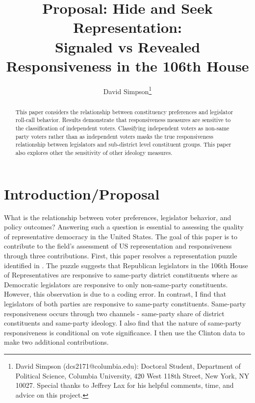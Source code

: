 \documentclass[10pt,letterpaper]{article}
\author{David Simpson\footnote{David Simpson (dcs2171@columbia.edu): Doctoral Student, Department of Political Science, Columbia University, 420 West 118th Street, New York, NY 10027. Special thanks to Jeffrey Lax for his helpful comments, time, and advice on this project.}}
\title{Proposal: Hide and Seek Representation: \\ 
\large Signaled vs Revealed Responsiveness in the 106th House}
\begin{document}
\maketitle

\begin{abstract}
This paper considers the relationship between constituency preferences and legislator roll-call behavior. Results demonstrate that responsiveness measures are sensitive to the classification of independent voters. Classifying independent voters as non-same party voters rather than as independent voters masks the true responsiveness relationship between legislators and sub-district level constituent groups. This paper also explores other the sensitivity of other ideology measures.
\end{abstract}

\section{Introduction/Proposal}
What is the relationship between voter preferences, legislator behavior, and policy outcomes? Answering such a question is essential to assessing the quality of representative democracy in the United States. The goal of this paper is to contribute to the field's assessment of US representation and responsiveness through three contributions. First, this paper resolves a representation puzzle identified in \cite{Clinton2006}. The puzzle suggests that Republican legislators in the 106th House of Representatives are responsive to same-party district constituents where as Democratic legislators are responsive to only non-same-party constituents. However, this observation is due to a coding error. In contrast, I find that legislators of both parties are responsive to same-party constituents. Same-party responsiveness occurs through two channels - same-party share of district constituents and same-party ideology. I also find that the nature of same-party responsiveness is conditional on vote significance. I then use the Clinton data to make two additional contributions.
\end{document}
